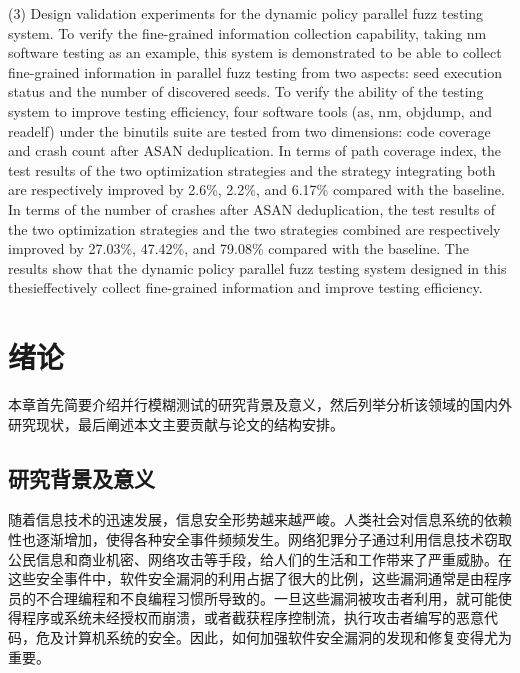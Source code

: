 \documentclass[master]{thesis-uestc}
\begin{document}
\begin{englishabstract}
(3) Design validation experiments for the dynamic policy parallel fuzz testing system. To verify the fine-grained information collection capability, taking nm software testing as an example, this system is demonstrated to be able to collect fine-grained information in parallel fuzz testing from two aspects: seed execution status and the number of discovered seeds. To verify the ability of the testing system to improve testing efficiency, four software tools (as, nm, objdump, and readelf) under the binutils suite are tested from two dimensions: code coverage and crash count after ASAN deduplication. In terms of path coverage index, the test results of the two optimization strategies and the strategy integrating both are respectively improved by 2.6\%, 2.2\%, and 6.17\% compared with the baseline. In terms of the number of crashes after ASAN deduplication, the test results of the two optimization strategies and the two strategies combined are respectively improved by 27.03\%, 47.42\%, and 79.08\% compared with the baseline. The results show that the dynamic policy parallel fuzz testing system designed in this thesieffectively collect fine-grained information and improve testing efficiency.
        
\end{englishabstract}

\thesistableofcontents %

\chapter{绪\hspace{6pt}论}
本章首先简要介绍并行模糊测试的研究背景及意义，然后列举分析该领域的国内外研究现状，最后阐述本文主要贡献与论文的结构安排。

\section{研究背景及意义}

随着信息技术的迅速发展，信息安全形势越来越严峻。人类社会对信息系统的依赖性也逐渐增加，使得各种安全事件频频发生。网络犯罪分子通过利用信息技术窃取公民信息和商业机密、网络攻击等手段，给人们的生活和工作带来了严重威胁。在这些安全事件中，软件安全漏洞的利用占据了很大的比例，这些漏洞通常是由程序员的不合理编程和不良编程习惯所导致的。一旦这些漏洞被攻击者利用，就可能使得程序或系统未经授权而崩溃，或者截获程序控制流，执行攻击者编写的恶意代码，危及计算机系统的安全。因此，如何加强软件安全漏洞的发现和修复变得尤为重要。
\end{document}
